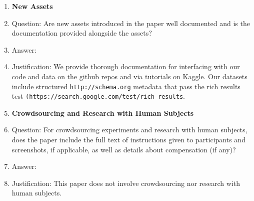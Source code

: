 \documentclass{article}
\begin{document}
\begin{enumerate}
\item {\bf New Assets}
    \item[] Question: Are new assets introduced in the paper well documented and is the documentation provided alongside the assets?
    \item[] Answer: \answerYes{} %
    \item[] Justification: We provide thorough documentation for interfacing with our code and data on the github repos and via tutorials on Kaggle. Our datasets include structured \texttt{http://schema.org} metadata that pass the rich results test \texttt{(https://search.google.com/test/rich-results}. 

\item {\bf Crowdsourcing and Research with Human Subjects}
    \item[] Question: For crowdsourcing experiments and research with human subjects, does the paper include the full text of instructions given to participants and screenshots, if applicable, as well as details about compensation (if any)? 
    \item[] Answer: \answerNA{} %
    \item[] Justification: This paper does not involve crowdsourcing nor research with human subjects.


\end{enumerate}
\end{document}
